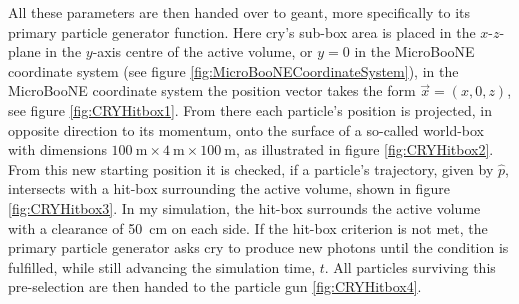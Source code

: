 All these parameters are then handed over to \gls{geant}, more specifically to its primary particle generator function. Here \gls{cry}'s sub-box area is placed in the $x$-$z$-plane in the $y$-axis centre of the active volume, or $y = 0$ in the MicroBooNE coordinate system (see figure \ref{fig:MicroBooNECoordinateSystem}), \ie in the MicroBooNE coordinate system the position vector takes the form $\vec{x} = (x,0,z)$, see figure \ref{fig:CRYHitbox1}. From there each particle's position is projected, in opposite direction to its momentum, onto the surface of a so-called world-box with dimensions $\SI{100}{\metre}\times \SI{4}{\metre} \times \SI{100}{\metre}$, as illustrated in figure \ref{fig:CRYHitbox2}. From this new starting position it is checked, if a particle's trajectory, given by $\hat{p}$, intersects with a hit-box surrounding the active volume, shown in figure \ref{fig:CRYHitbox3}. In my simulation, the hit-box surrounds the active volume with a clearance of \SI{50}{\centi\metre} on each side. If the hit-box criterion is not met, the primary particle generator asks \gls{cry} to produce new photons until the condition is fulfilled, while still advancing the simulation time, $t$. All particles surviving this pre-selection are then handed to the particle gun \ref{fig:CRYHitbox4}.
